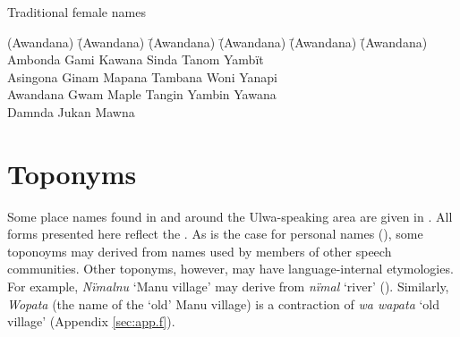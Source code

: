 \ea%
    \label{ex:sem:37}
          Traditional female names
\begin{tabbing}
{(Awandana)} \= {(Awandana)} \= {(Awandana)} \= {(Awandana)} \= {(Awandana)} \= {(Awandana)}\kill
Ambonda \> Gami \> Kawana \> Sinda \> Tanom \> Yambït\\
Asingona \> Ginam \> Mapana \> Tambana \> Woni \> Yanapi\\
Awandana \> Gwam \> Maple \> Tangin \> Yambin \> Yawana\\
Damnda \> Jukan \> Mawna \> { } \> { } \> { }
\end{tabbing}
\z

\section{{Toponyms}}\label{sec:14.11}


Some place names found in and around the Ulwa-speaking area are given in . All forms presented here reflect the  . As is the case for personal names (), some toponoyms may derived from names used by members of other speech communities. Other toponyms, however, may have language-internal etymologies. For example, \textit{Nïmalnu} ‘Manu village’ may derive from \linebreak \textit{nïmal} ‘river’ (). Similarly, \textit{Wopata} (the name of the ‘old’ Manu village) is a contraction of \textit{wa wapata} ‘old village’ (Appendix \ref{sec:app.f}).


